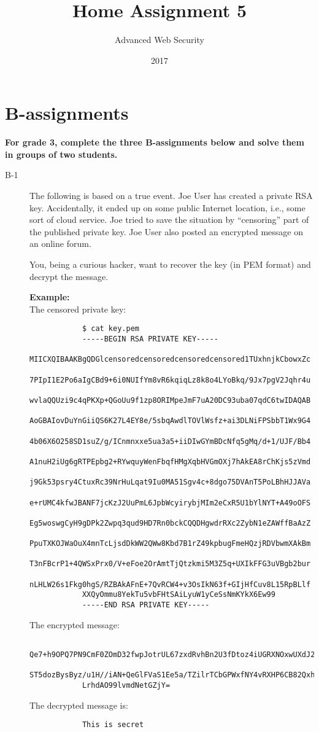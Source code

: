 \documentclass{article}
\begin{document}
	
	\title{Home Assignment 5}
	\author{Advanced Web Security}
	\date{2017}
	
	\maketitle
	
	\section*{B-assignments}
	\textbf{For grade 3, complete the three B-assignments below and solve them in groups of two students.}
	
	\begin{description}
		
		\item[B-1]{The following is based on a true event. Joe User has created a private RSA key. Accidentally, it ended up on some public Internet location, i.e., some sort of cloud service. Joe tried to save the situation by ``censoring'' part of the published private key.
			Joe User also posted an encrypted message on an online forum.
			
			You, being a curious hacker, want to recover the key (in PEM format) and decrypt the message.
			
			\textbf{Example:}\\
			The censored private key:
			\begin{verbatim}
			$ cat key.pem
			-----BEGIN RSA PRIVATE KEY-----
			MIICXQIBAAKBgQDGlcensoredcensoredcensoredcensored1TUxhnjkCbowxZc
			7PIpI1E2Po6aIgCBd9+6i0NUIfYm8vR6kqiqLz8k8o4LYoBkq/9Jx7pgV2Jqhr4u
			wvlaQQUzi9c4qPKXp+QGoUu9f1zp8ORIMpeJmF7uA20DC93uba07qdC6twIDAQAB
			AoGBAIovDuYnGiiQS6K27L4EY8e/5sbqAwdlTOVlWsfz+ai3DLNiFPSbbT1Wx9G4
			4b06X6O258SD1suZ/g/ICnmnxxe5ua3a5+iiDIwGYmBDcNfq5gMq/d+1/UJF/Bb4
			A1nuH2iUg6gRTPEpbg2+RYwquyWenFbqfHMgXqbHVGmOXj7hAkEA8rChKjs5zVmd
			j9Gk53psry4CtuxRc39NrHuLqat9Iu0MA51Sgv4c+8dgo75DVAnT5PoLBhHJJAVa
			e+rUMC4kfwJBANF7jcKzJ2UuPmL6JpbWcyirybjMIm2eCxR5U1bYlNYT+A49oOFS
			Eg5woswgCyH9gDPk2Zwpq3qud9HD7Rn0bckCQQDHgwdrRXc2ZybN1eZAWffBaAzZ
			PpuTXKOJWaOuX4mnTcLjsdDkWW2QWw8Kbd7B1rZ49kpbugFmeHQzjRDVbwmXAkBm
			T3nFBcrP1+4QWSxPrx0/V+eFoe2OrAmtTjQtzkmi5M3Z5q+UXIkFFG3uVBgb2bur
			nLHLW26s1Fkg0hgS/RZBAkAFnE+7QvRCW4+v3OsIkN63f+GIjHfCuv8L15RpBLlf
			XXQyOmmu8YekTu5vbFHtSAiLyuW1yCeSsNmKYkX6Ew99
			-----END RSA PRIVATE KEY-----
			\end{verbatim}	
			The encrypted message:
			\begin{verbatim}
			Qe7+h9OPQ7PN9CmF0ZOmD32fwpJotrUL67zxdRvhBn2U3fDtoz4iUGRXNOxwUXdJ2Cmz7zjS0DE8
			ST5dozBysByz/u1H//iAN+QeGlFVaS1Ee5a/TZilrTCbGPWxfNY4vRXHP6CB82QxhMjQ7/x90/+J
			LrhdAO99lvmdNetGZjY=
			\end{verbatim}
			The decrypted message is:
			\begin{verbatim}
			This is secret
			\end{verbatim}

}
\end{description}
\end{document}
